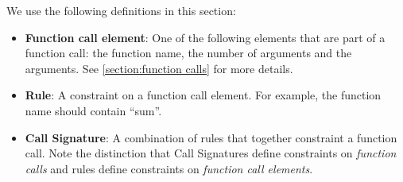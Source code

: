 We use the following definitions in this section:
\begin{itemize}
  \item \textbf{Function call element}: One of the following elements that are part of a function call: the function name, the number of arguments and the arguments. See \autoref{section:function calls} for more details.

  \item \textbf{Rule}: A constraint on a function call element. For example, the function name should contain ``sum''.

  \item \textbf{Call Signature}: A combination of rules that together constraint a function call. Note the distinction that Call Signatures define constraints on \emph{function calls} and rules define constraints on \emph{function call elements}.
\end{itemize}



